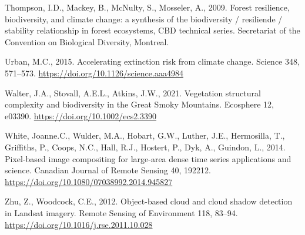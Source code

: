 \documentclass[
]{agujournal2019}
\newlength{\cslhangindent}
\newenvironment{CSLReferences}[2] %
 {\begin{list}{}{%
  \setlength{\itemindent}{0pt}
  \setlength{\leftmargin}{0pt}
  \setlength{\parsep}{0pt}
  \ifodd #1
   \setlength{\leftmargin}{\cslhangindent}
   \setlength{\itemindent}{-1\cslhangindent}
  \fi
  \setlength{\itemsep}{#2\baselineskip}}}
 {\end{list}}
\begin{document}
\begin{CSLReferences}{1}{0}
Thompson, I.D., Mackey, B., McNulty, S., Mosseler, A., 2009. Forest
resilience, biodiversity, and climate change: a synthesis of the
biodiversity / resiliende / stability relationship in forest ecosystems,
CBD technical series. Secretariat of the Convention on Biological
Diversity, Montreal.

Urban, M.C., 2015. Accelerating extinction risk from climate change.
Science 348, 571--573. \url{https://doi.org/10.1126/science.aaa4984}

Walter, J.A., Stovall, A.E.L., Atkins, J.W., 2021. Vegetation structural
complexity and biodiversity in the Great Smoky Mountains. Ecosphere 12,
e03390. \url{https://doi.org/10.1002/ecs2.3390}

White, Joanne.C., Wulder, M.A., Hobart, G.W., Luther, J.E., Hermosilla,
T., Griffiths, P., Coops, N.C., Hall, R.J., Hostert, P., Dyk, A.,
Guindon, L., 2014. Pixel-based image compositing for large-area dense
time series applications and science. Canadian Journal of Remote Sensing
40, 192212. \url{https://doi.org/10.1080/07038992.2014.945827}

Zhu, Z., Woodcock, C.E., 2012. Object-based cloud and cloud shadow
detection in Landsat imagery. Remote Sensing of Environment 118, 83--94.
\url{https://doi.org/10.1016/j.rse.2011.10.028}

\end{CSLReferences}
\end{document}

